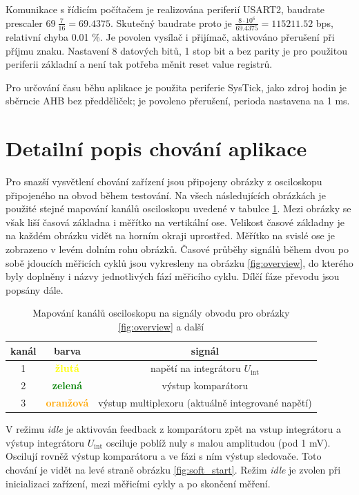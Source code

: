 \documentclass[twoside]{article}
\begin{document}
Komunikace s řídicím počítačem je realizována periferií USART2, baudrate prescaler $69~\frac{7}{16} = 69.4375$. Skutečný baudrate proto je $\frac{8\cdot 10^6}{69.4375} = 115211.52$ bps,
relativní chyba 0.01 \%. Je povolen vysílač i přijímač, aktivováno přerušení při příjmu znaku. Nastavení 8 datových bitů, 1 stop bit a bez parity je pro použitou periferii základní
a není tak potřeba měnit reset value registrů.

Pro určování času běhu aplikace je použita periferie SysTick, jako zdroj hodin je sběrncie AHB bez předděliček; je povoleno přerušení, perioda nastavena na 1 ms.


\section{Detailní popis chování aplikace}
\label{sec:detail}
Pro snazší vysvětlení chování zařízení jsou připojeny obrázky z osciloskopu připojeného na obvod během testování.
Na všech následujících obrázkách je použité stejné mapování kanálů osciloskopu uvedené v tabulce \ref{table:oscilloscope}.
Mezi obrázky se však liší časová základna i měřítko na vertikální ose. Velikost časové základny je na každém obrázku vidět
na horním okraji uprostřed. Měřítko na svislé ose je zobrazeno v levém dolním rohu obrázků.
Časové průběhy signálů během dvou po sobě jdoucích měřicích cyklů jsou vykresleny na obrázku \ref{fig:overview},
do kterého byly doplněny i názvy jednotlivých fází měřicího cyklu. Dílčí fáze převodu jsou popsány dále.

\begin{table}
    \centering
    \begin{tabular}{c|c|c}
        kanál & barva & signál \\ \hline
        1 & \textcolor{yellow}{\textbf{žlutá}} & napětí na integrátoru $U_{\text{int}}$ \\
        2 & \textcolor{green}{\textbf{zelená}} & výstup komparátoru \\
        3 & \textcolor{orange}{\textbf{oranžová}} & výstup multiplexoru (aktuálně integrované napětí)
    \end{tabular}
    \caption{Mapování kanálů osciloskopu na signály obvodu pro obrázky \ref{fig:overview} a další}
    \label{table:oscilloscope}
\end{table}

V režimu \textit{idle} je aktivován feedback z komparátoru zpět na vstup integrátoru a výstup integrátoru $U_{\text{int}}$ osciluje poblíž nuly s malou amplitudou (pod 1 mV).
Oscilují rovněž výstup komparátoru a ve fázi s ním výstup sledovače. Toto chování je vidět na levé straně obrázku \ref{fig:soft_start}.
Režim \textit{idle} je zvolen při inicializaci zařízení, mezi měřicími cykly a po skončení měření.
\end{document}
